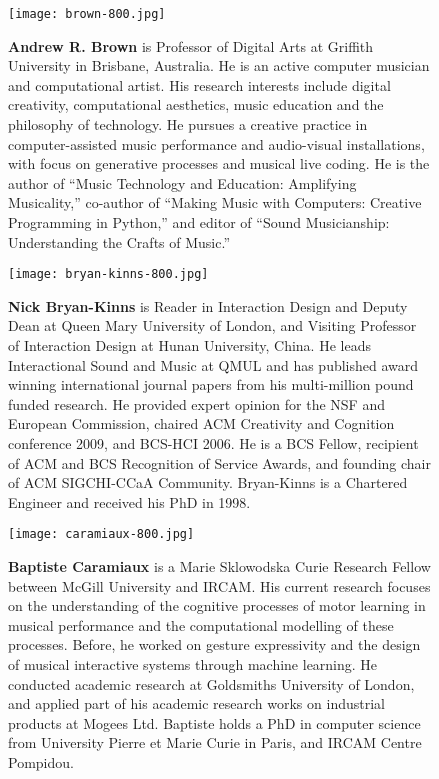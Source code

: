 \begin{authbio}
\begin{figure}[H]
  \sidecaption[t]
  \texttt{[image: brown-800.jpg]}
  \caption{\textbf{Andrew R. Brown} is Professor of Digital Arts at Griffith University in Brisbane, Australia. He is an active computer musician and computational artist. His research interests include digital creativity, computational aesthetics, music education and the philosophy of technology. He pursues a creative practice in computer-assisted music performance and audio-visual installations, with focus on generative processes and musical live coding. He is the author of ``Music Technology and Education: Amplifying Musicality,'' co-author of ``Making Music with Computers: Creative Programming in Python,'' and editor of ``Sound Musicianship: Understanding the Crafts of Music.''}
\end{figure}

\begin{figure}[H]
  \sidecaption[t]
  \texttt{[image: bryan-kinns-800.jpg]}
  \caption{\textbf{Nick Bryan-Kinns} is Reader in Interaction Design and Deputy Dean at Queen Mary University of London, and Visiting Professor of Interaction Design at Hunan University, China. He leads Interactional Sound and Music at QMUL and has published award winning international journal papers from his multi-million pound funded research. He provided expert opinion for the NSF and European Commission, chaired ACM Creativity and Cognition conference 2009, and BCS-HCI 2006. He is a BCS Fellow, recipient of ACM and BCS Recognition of Service Awards, and founding chair of ACM SIGCHI-CCaA Community. Bryan-Kinns is a Chartered Engineer and received his PhD in 1998.}
\end{figure}

\begin{figure}[H]
  \sidecaption[t]
  \texttt{[image: caramiaux-800.jpg]}
  \caption{\textbf{Baptiste Caramiaux} is a Marie Sklowodska Curie Research Fellow between McGill University and IRCAM. His current research focuses on the understanding of the cognitive processes of motor learning in musical performance and the computational modelling of these processes. Before, he worked on gesture expressivity and the design of musical interactive systems through machine learning. He conducted academic research at Goldsmiths University of London, and applied part of his academic research works on industrial products at Mogees Ltd. Baptiste holds a PhD in computer science from University Pierre et Marie Curie in Paris, and IRCAM Centre Pompidou.}
\end{figure}


\end{authbio}

